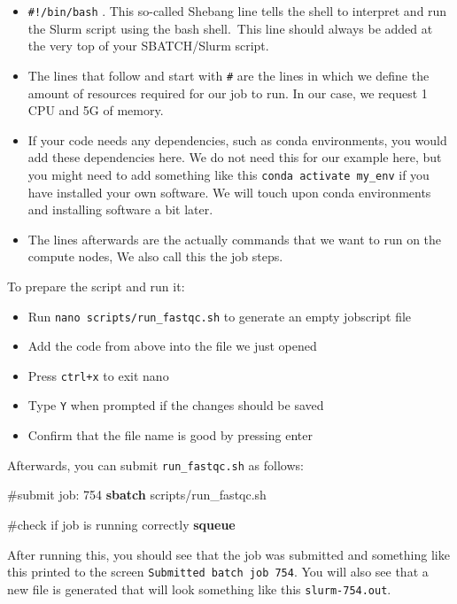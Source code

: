 \documentclass[
  letterpaper,
  DIV=11,
  numbers=noendperiod]{scrreprt}
\newenvironment{Shaded}{}{}
\newcommand{\CommentTok}[1]{\textcolor[rgb]{0.42,0.45,0.49}{#1}}
\newcommand{\ExtensionTok}[1]{\textcolor[rgb]{0.84,0.23,0.29}{\textbf{#1}}}
\newcommand{\NormalTok}[1]{\textcolor[rgb]{0.14,0.16,0.18}{#1}}
\providecommand{\tightlist}{%
  \setlength{\itemsep}{0pt}\setlength{\parskip}{0pt}}\usepackage{longtable,booktabs,array}
\begin{document}
\begin{itemize}
\tightlist
\item
  \texttt{\#!/bin/bash} . This so-called Shebang line tells the shell to
  interpret and run the Slurm script using the bash shell.~This line
  should always be added at the very top of your SBATCH/Slurm script.
\item
  The lines that follow and start with \texttt{\#} are the lines in
  which we define the amount of resources required for our job to run.
  In our case, we request 1 CPU and 5G of memory.
\item
  If your code needs any dependencies, such as conda environments, you
  would add these dependencies here. We do not need this for our example
  here, but you might need to add something like this
  \texttt{conda\ activate\ my\_env} if you have installed your own
  software. We will touch upon conda environments and installing
  software a bit later.
\item
  The lines afterwards are the actually commands that we want to run on
  the compute nodes, We also call this the job steps.
\end{itemize}

To prepare the script and run it:

\begin{itemize}
\tightlist
\item
  Run \texttt{nano\ scripts/run\_fastqc.sh} to generate an empty
  jobscript file
\item
  Add the code from above into the file we just opened
\item
  Press \texttt{ctrl+x} to exit nano
\item
  Type \texttt{Y} when prompted if the changes should be saved
\item
  Confirm that the file name is good by pressing enter
\end{itemize}

Afterwards, you can submit \texttt{run\_fastqc.sh} as follows:

\begin{Shaded}
\begin{Highlighting}[]
\CommentTok{\#submit job: 754}
\ExtensionTok{sbatch}\NormalTok{ scripts/run\_fastqc.sh}

\CommentTok{\#check if job is running correctly}
\ExtensionTok{squeue}
\end{Highlighting}
\end{Shaded}

After running this, you should see that the job was submitted and
something like this printed to the screen
\texttt{Submitted\ batch\ job\ 754}. You will also see that a new file
is generated that will look something like this \texttt{slurm-754.out}.
\end{document}
